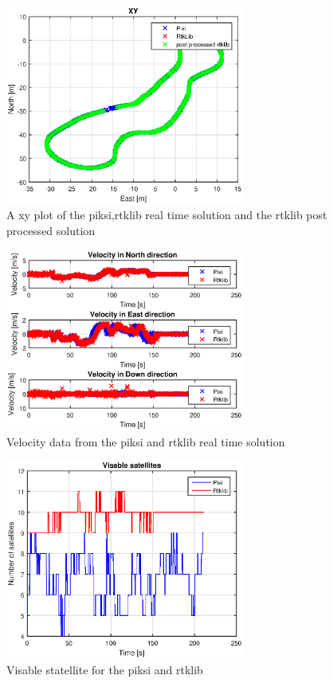 \begin{figure}[H]
	\centering
		\includegraphics[width=0.7\textwidth]{figs/plots/xy.eps}
		\caption{A xy plot of the piksi,rtklib real time solution and the rtklib post processed solution}
		\label{figure:RTKLIB_STRUCTURE}
\end{figure}
\begin{figure}[H]
	\centering
		\includegraphics[width=0.7\textwidth]{figs/plots/velocity.eps}
		\caption{Velocity data from the piksi and rtklib real time solution}
		\label{figure:RTKLIB_STRUCTURE}
\end{figure}
\begin{figure}[H]
	\centering
		\includegraphics[width=0.7\textwidth]{figs/plots/sv.eps}
		\caption{Visable statellite for the piksi and rtklib}
		\label{figure:RTKLIB_STRUCTURE}
\end{figure}

